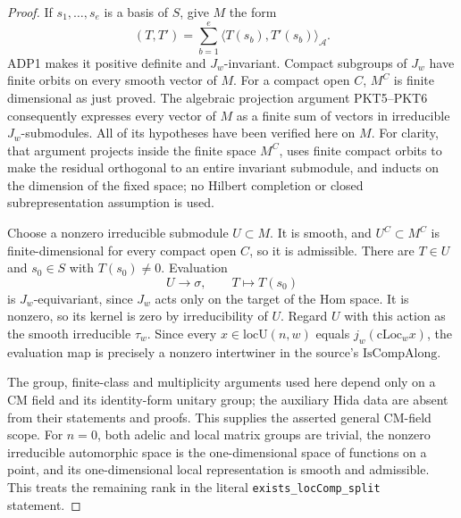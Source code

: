 \begin{proof}
If \(s_1,\ldots,s_e\) is a basis of \(S\), give \(M\) the form
\[
            (T,T')=\sum_{b=1}^e
                         \langle T(s_b),T'(s_b)\rangle_{\mathcal A}.
\]
ADP1 makes it positive definite and \(J_w\)-invariant.
Compact subgroups of \(J_w\) have finite orbits on every smooth
vector of \(M\).  For a compact open \(C\), \(M^C\) is finite
dimensional as just proved.  The algebraic projection argument
PKT5--PKT6 consequently expresses every vector of \(M\) as a
finite sum of vectors in irreducible \(J_w\)-submodules.
All of its hypotheses have been verified here on \(M\).
For clarity, that argument projects inside the finite space
\(M^C\), uses finite compact orbits to make the residual
orthogonal to an entire invariant submodule, and inducts on the
dimension of the fixed space; no Hilbert completion or closed
subrepresentation assumption is used.

Choose a nonzero irreducible submodule \(U\subset M\).
It is smooth, and \(U^C\subset M^C\) is finite-dimensional for
every compact open \(C\), so it is admissible.
There are \(T\in U\) and \(s_0\in S\) with \(T(s_0)\ne0\).
Evaluation
\[
                       U\longrightarrow\sigma,\qquad
                                T\longmapsto T(s_0)
\]
is \(J_w\)-equivariant, since \(J_w\) acts only on the target
of the Hom space.  It is nonzero, so its kernel is zero by
irreducibility of \(U\).  Regard \(U\) with this action as the
smooth irreducible \(\tau_w\).  Since every
\(x\in\mathrm{locU}(n,w)\) equals \(j_w(\mathrm{cLoc}_w x)\),
the evaluation map is precisely a nonzero intertwiner in the
source's \(\mathrm{IsCompAlong}\).

The group, finite-class and multiplicity arguments used here
depend only on a CM field and its identity-form unitary group;
the auxiliary Hida data are absent from their statements and
proofs.  This supplies the asserted general CM-field scope.
For \(n=0\), both adelic and local matrix groups are trivial,
the nonzero irreducible automorphic space is the one-dimensional
space of functions on a point, and its one-dimensional local
representation is smooth and admissible.  This treats the
remaining rank in the literal \texttt{exists\_locComp\_split}
statement.
\end{proof}

